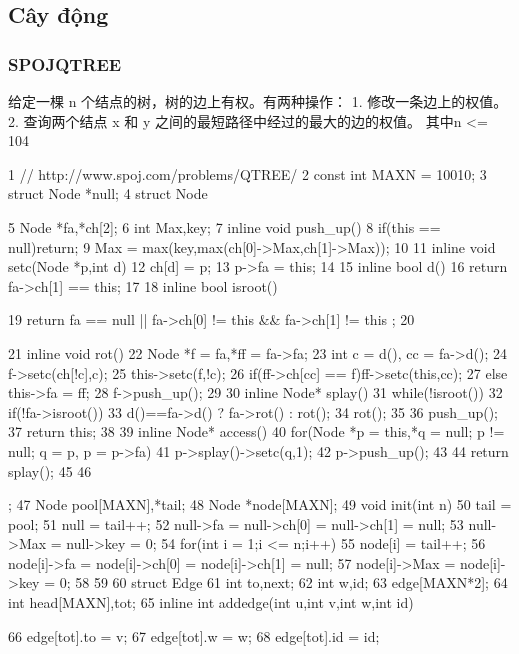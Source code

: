 \documentclass[11pt]{article}
\begin{document}
\subsection{Cây động}

\subsubsection{SPOJQTREE}

\begin{Code}
     给定一棵 n 个结点的树，树的边上有权。有两种操作：
     1. 修改一条边上的权值。
     2. 查询两个结点 x 和 y 之间的最短路径中经过的最大的边的权值。
     其中n <= 104

 1   // http://www.spoj.com/problems/QTREE/
 2   const int MAXN = 10010;
 3   struct Node *null;
 4   struct Node{
 5       Node *fa,*ch[2];
 6       int Max,key;
 7       inline void push_up(){
 8           if(this == null)return;
 9           Max = max(key,max(ch[0]->Max,ch[1]->Max));
10       }
11       inline void setc(Node *p,int d){
12           ch[d] = p;
13           p->fa = this;
14       }
15       inline bool d(){
16           return fa->ch[1] == this;
17       }
18       inline bool isroot() {


19              return fa == null || fa->ch[0] != this && fa->ch[1] != this
                   ;
20       }
21       inline void rot(){
22           Node *f = fa,*ff = fa->fa;
23           int c = d(), cc = fa->d();
24           f->setc(ch[!c],c);
25           this->setc(f,!c);
26           if(ff->ch[cc] == f)ff->setc(this,cc);
27           else this->fa = ff;
28           f->push_up();
29       }
30       inline Node* splay(){
31           while(!isroot()){
32               if(!fa->isroot())
33                   d()==fa->d() ? fa->rot() : rot();
34               rot();
35           }
36           push_up();
37           return this;
38       }
39       inline Node* access(){
40           for(Node *p = this,*q = null; p != null; q = p, p = p->fa){
41               p->splay()->setc(q,1);
42               p->push_up();
43           }
44           return splay();
45       }
46   };
47   Node pool[MAXN],*tail;
48   Node *node[MAXN];
49   void init(int n){
50       tail = pool;
51       null = tail++;
52       null->fa = null->ch[0] = null->ch[1] = null;
53       null->Max = null->key = 0;
54       for(int i = 1;i <= n;i++){
55           node[i] = tail++;
56           node[i]->fa = node[i]->ch[0] = node[i]->ch[1] = null;
57           node[i]->Max = node[i]->key = 0;
58       }
59   }
60   struct Edge{
61       int to,next;
62       int w,id;
63   }edge[MAXN*2];
64   int head[MAXN],tot;
65   inline int addedge(int u,int v,int w,int id){
66       edge[tot].to = v;
67       edge[tot].w = w;
68       edge[tot].id = id;


}
\end{Code}
\end{document}
